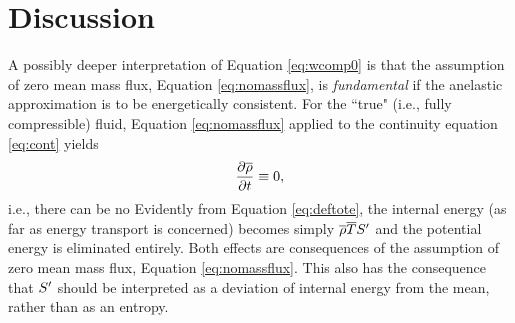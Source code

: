 \documentclass[12pt]{article}
\begin{document}
\section{Discussion}

A possibly deeper interpretation of Equation \eqref{eq:wcomp0} is that the assumption of zero mean mass flux, Equation \eqref{eq:nomassflux}, is \textit{fundamental} if the anelastic approximation is to be energetically consistent. For the ``true" (i.e., fully compressible) fluid, Equation \eqref{eq:nomassflux} applied to the continuity equation \eqref{eq:cont} yields
\begin{align}
	\frac{\partial\overline{\rho}}{\partial t}\equiv0,
\end{align}
i.e., there can be no
Evidently from Equation \eqref{eq:deftote}, the internal energy (as far as energy transport is concerned) becomes simply $\overline{\rho}\overline{T} {S^\prime}$ and the potential energy is eliminated entirely. Both effects are consequences of the assumption of zero mean mass flux, Equation \eqref{eq:nomassflux}. This also has the consequence that ${S^\prime}$ should be interpreted as a deviation of internal energy from the mean, rather than as an entropy. 

\end{document}
